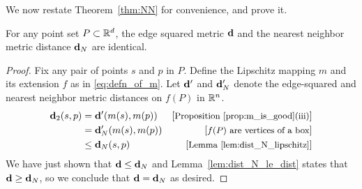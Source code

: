   We now restate Theorem~\ref{thm:NN} for convenience, and prove
  it.
  \begin{theorem}\label{thm:equality}
    For any point set $P\subset\mathbb{R}^d$, the edge squared metric $\mathbf{d}$ and the nearest neighbor metric distance $\mathbf{d}_N$ are identical.
  \end{theorem}
  \begin{proof}
    Fix any pair of points $s$ and $p$ in $P$.
    Define the Lipschitz mapping $m$ and its extension $f$ as in \eqref{eq:defn_of_m}.
    Let $\mathbf{d}'$ and $\mathbf{d}_N'$ denote the edge-squared and nearest neighbor metric distances on $f(P)$ in $\mathbb{R}^n$.
    \begin{align*}
      \mathbf{d}_2(s,p) 
        &= \mathbf{d}'(m(s), m(p)) &\left[\text{\small{Proposition~\ref{prop:m_is_good}(iii)}}\right]\\
        &= \mathbf{d}_N'(m(s), m(p)) &\left[\text{\small{$f(P)$ are vertices of a box}}\right]\\
        &\le \mathbf{d}_N(s, p) &\left[\text{\small{Lemma~\ref{lem:dist_N_lipschitz}}}\right]
    \end{align*}
    We have just shown that $\mathbf{d}\le \mathbf{d}_N$ and Lemma~\ref{lem:dist_N_le_dist} states that $\mathbf{d}\ge \mathbf{d}_N$, so we conclude that $\mathbf{d} = \mathbf{d}_N$ as desired.
  \end{proof}

